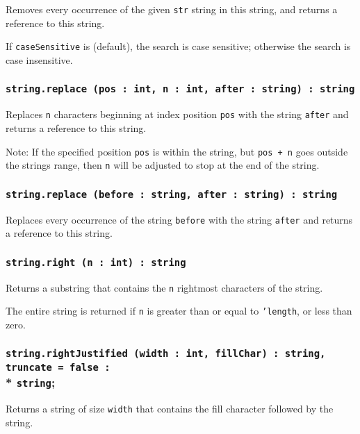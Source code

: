 Removes every occurrence of the given \texttt{str} string in this string, and returns a reference to this string.

If \texttt{caseSensitive} is \true{} (default), the search is case sensitive; otherwise the search is case insensitive.

\subsubsection{\texttt{string.replace (pos : int, n : int, after : string) : string}}

Replaces \texttt{n} characters beginning at index position \texttt{pos} with the string \texttt{after} and returns a reference to this string.

Note: If the specified position \texttt{pos} is within the string, but \texttt{pos + n} goes outside the strings range, then \texttt{n} will be adjusted to stop at the end of the string.

\subsubsection{\texttt{string.replace (before : string, after : string) : string}}

Replaces every occurrence of the string \texttt{before} with the string \texttt{after} and returns a reference to this string.

\subsubsection{\texttt{string.right (n : int) : string}}

Returns a substring that contains the \texttt{n} rightmost characters of the string.

The entire string is returned if \texttt{n} is greater than or equal to \texttt{'length}, or less than zero.

\subsubsection{\texttt{string.rightJustified (width : int, fillChar) : string, truncate = false :}\\* \texttt{string};}

Returns a string of size \texttt{width} that contains the fill character followed by the string.

